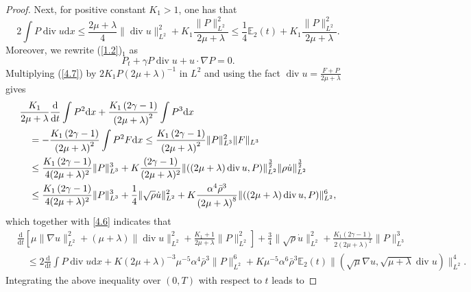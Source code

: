 \documentclass[10pt,a4paper]{amsart}
\DeclareMathOperator{\divv}{div}
\begin{document}
\begin{proof}
Next, for positive constant $K_1 > 1 $, one has that
$$
2 \int P \divv u \mathrm{d} x
\leq \frac{2\mu + \lambda }{4} \|\divv u\|_{L^2}^2 + K_1 \frac{ \|P\|_{L^2}^2}{2 \mu + \lambda } \leq \frac{1}{4} \mathbb{E}_2 (t) + K_1 \frac{ \|P\|_{L^2}^2}{2 \mu + \lambda }.
$$
Moreover, we rewrite (\ref{1.2})$_1$ as
\begin{equation}\label{4.7}
P_t + \gamma P \divv u + u \cdot \nabla P = 0.
\end{equation}
Multiplying (\ref{4.7}) by $2 K_1 P \left(2 \mu + \lambda \right)^{-1}$ in $L^2$ and using the fact
$\divv u = \frac{F + P }{2 \mu + \lambda }$ gives
\begin{align*}
& \frac{K_1}{2 \mu + \lambda } \frac{\mathrm{d}}{\mathrm{d} t} \int P^2 \mathrm{d} x + \frac{K_1 \left( 2 \gamma - 1\right)}{\left(2 \mu + \lambda \right)^2} \int P^3 \mathrm{d} x\notag\\
& \quad = - \frac{ K_1 \left(2 \gamma - 1 \right)}{\left(2 \mu + \lambda \right)^2} \int P^2 F \mathrm{d} x \leq \frac{K_1 \left(2 \gamma - 1 \right)}{\left(2 \mu + \lambda \right)^2} \|P\|_{L^3}^2 \|F\|_{L^3}\notag\\
& \quad \leq \frac{K_1 \left(2 \gamma - 1 \right)}{4 (2 \mu + \lambda )^2} \|P\|_{L^3}^3 + K \frac{\left(2 \gamma - 1 \right)}{(2 \mu + \lambda )^2} \|((2 \mu + \lambda )\divv u, P)\|_{L^2}^{\frac{3}{2}} \|\rho \dot u\|_{L^2}^{\frac{3}{2}}\notag\\
& \quad \leq \frac{K_1 \left(2 \gamma - 1 \right)}{4 (2 \mu + \lambda )^2} \|P\|_{L^3}^3 + \frac{1}{4} \|\sqrt{\rho} \dot{u}\|_{L^2}^2 + K \frac{\alpha^{4} \bar{\rho}^3}{\left( 2 \mu + \lambda \right)^8} \|((2 \mu + \lambda )\divv u, P)\|_{L^2}^6,
\end{align*}
which together with \eqref{4.6} indicates that
\begin{align*}
& \frac{\mathrm{d}}{\mathrm{d} t} \left[\mu \|\nabla u\|_{L^2}^2 + \left(\mu + \lambda \right)\|\divv u\|_{L^2}^2 + \frac{K_1 + 1}{2 \mu + \lambda } \|P\|_{L^2}^2 \right] + \frac{3}{4} \|\sqrt{\rho} \dot{u}\|_{L^2}^2 + \frac{K_1 \left( 2 \gamma - 1\right)}{2 \left(2 \mu + \lambda \right)^2} \|P\|_{L^3}^3\\
& \quad \leq 2 \frac{\mathrm{d}}{\mathrm{d} t} \int P \divv u \mathrm{d} x + K \left( 2 \mu + \lambda \right)^{-3} \mu^{-5} \alpha^4 \bar{\rho}^3 \|P\|_{L^2}^6 + K \mu^{-5} \alpha^6 \bar{\rho}^3 \mathbb{E}_2 (t) \|(\sqrt{\mu}\nabla u, \sqrt{\mu + \lambda} \divv u)\|_{L^2}^4.
\end{align*}
Integrating the above inequality over $(0,T)$ with respect to $t$ leads to

\end{proof}
\end{document}
